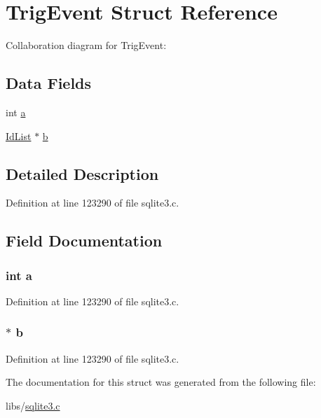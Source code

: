 \hypertarget{struct_trig_event}{}\section{Trig\+Event Struct Reference}
\label{struct_trig_event}


Collaboration diagram for Trig\+Event\+:
\subsection*{Data Fields}
\begin{DoxyCompactItemize}
\item 
int \hyperlink{struct_trig_event_aa4c2a5552e9bc49b1816ff532f558c74}{a}
\item 
\hyperlink{struct_id_list}{Id\+List} $\ast$ \hyperlink{struct_trig_event_a4c0afb070ac10d2f889ccb4fd4e0c878}{b}
\end{DoxyCompactItemize}


\subsection{Detailed Description}


Definition at line 123290 of file sqlite3.\+c.



\subsection{Field Documentation}
\hypertarget{struct_trig_event_aa4c2a5552e9bc49b1816ff532f558c74}{}
\subsubsection[{a}]{\setlength{\rightskip}{0pt plus 5cm}int a}\label{struct_trig_event_aa4c2a5552e9bc49b1816ff532f558c74}


Definition at line 123290 of file sqlite3.\+c.

\hypertarget{struct_trig_event_a4c0afb070ac10d2f889ccb4fd4e0c878}{}
\subsubsection[{b}]{$\ast$ b}\label{struct_trig_event_a4c0afb070ac10d2f889ccb4fd4e0c878}


Definition at line 123290 of file sqlite3.\+c.



The documentation for this struct was generated from the following file\+:\begin{DoxyCompactItemize}
\item 
libs/\hyperlink{sqlite3_8c}{sqlite3.\+c}\end{DoxyCompactItemize}
